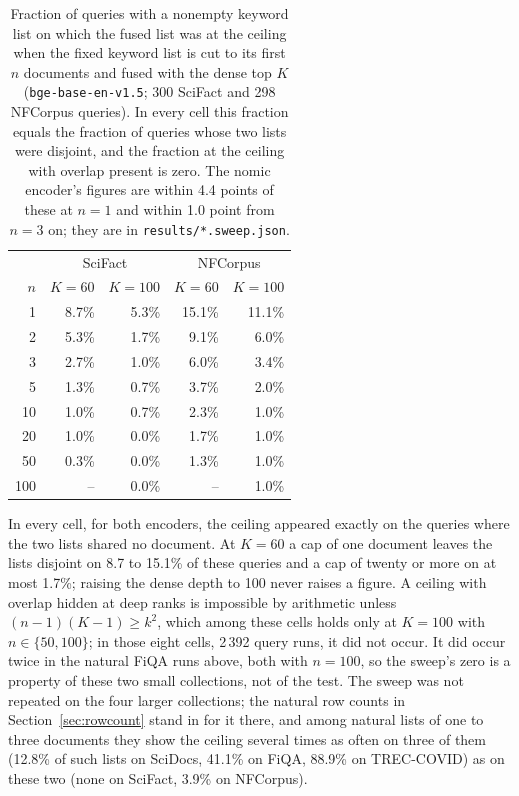 \documentclass[11pt]{article}
\begin{document}
\begin{table}[h]
\centering
\small
\begin{tabular}{rrrrr}
\toprule
 & \multicolumn{2}{c}{SciFact} & \multicolumn{2}{c}{NFCorpus} \\
$n$ & $K=60$ & $K=100$ & $K=60$ & $K=100$ \\
\midrule
1 & 8.7\% & 5.3\% & 15.1\% & 11.1\% \\
2 & 5.3\% & 1.7\% & 9.1\% & 6.0\% \\
3 & 2.7\% & 1.0\% & 6.0\% & 3.4\% \\
5 & 1.3\% & 0.7\% & 3.7\% & 2.0\% \\
10 & 1.0\% & 0.7\% & 2.3\% & 1.0\% \\
20 & 1.0\% & 0.0\% & 1.7\% & 1.0\% \\
50 & 0.3\% & 0.0\% & 1.3\% & 1.0\% \\
100 & -- & 0.0\% & -- & 1.0\% \\
\bottomrule
\end{tabular}
\caption{Fraction of queries with a nonempty keyword list on which the fused list was at the ceiling when the fixed keyword list is cut to its first $n$ documents and fused with the dense top $K$ (\texttt{bge-base-en-v1.5}; 300 SciFact and 298 NFCorpus queries). In every cell this fraction equals the fraction of queries whose two lists were disjoint, and the fraction at the ceiling with overlap present is zero. The nomic encoder's figures are within 4.4 points of these at $n=1$ and within 1.0 point from $n=3$ on; they are in \texttt{results/*.sweep.json}.}
\label{tab:sweep}
\end{table}

In every cell, for both encoders, the ceiling appeared exactly on the queries where the two lists shared no document. At $K = 60$ a cap of one document leaves the lists disjoint on 8.7 to 15.1\% of these queries and a cap of twenty or more on at most 1.7\%; raising the dense depth to 100 never raises a figure. A ceiling with overlap hidden at deep ranks is impossible by arithmetic unless $(n-1)(K-1) \ge k^2$, which among these cells holds only at $K = 100$ with $n \in \{50, 100\}$; in those eight cells, 2\,392 query runs, it did not occur. It did occur twice in the natural FiQA runs above, both with $n = 100$, so the sweep's zero is a property of these two small collections, not of the test. The sweep was not repeated on the four larger collections; the natural row counts in Section~\ref{sec:rowcount} stand in for it there, and among natural lists of one to three documents they show the ceiling several times as often on three of them (12.8\% of such lists on SciDocs, 41.1\% on FiQA, 88.9\% on TREC-COVID) as on these two (none on SciFact, 3.9\% on NFCorpus).
\end{document}
